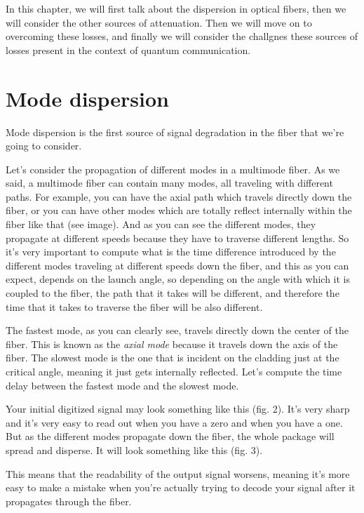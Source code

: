 In this chapter, we will first talk about the dispersion in optical fibers, then we will consider the other sources of attenuation. Then we will move on to overcoming these losses, and finally we will consider the challgnes these sources of losses present in the context of quantum communication.


\section{Mode dispersion}
\label{sec:11-2_mode_dispersion}

Mode dispersion is the first source of signal degradation in the fiber that we're going to consider.

Let's consider the propagation of different modes in a multimode fiber. As we said, a multimode fiber can contain many modes, all traveling with different paths. For example, you can have the axial path which travels directly down the fiber, or you can have other modes which are  totally reflect internally within the fiber like that (see image). And as you can see the different modes, they propagate at different speeds because they have to traverse different lengths. So it's very important to compute what is the time difference introduced by the different modes traveling at different speeds down the fiber, and this as you can expect, depends on the launch angle, so depending on the angle with which it is coupled to the fiber, the path that it takes will be different, and therefore the time that it takes to traverse the fiber will be also different.

The fastest mode, as you can clearly see, travels directly down the center of the fiber. This is known as the \emph{axial mode} because it travels down the axis of the fiber. The slowest mode is the one that is incident on the cladding just at the critical angle, meaning it just gets internally reflected.  Let's compute the time delay between the fastest mode and the slowest mode.

Your initial digitized signal may look something like this (fig. 2). It's very sharp and it's very easy to read out when you have a zero and when you have a one. But as the different modes propagate down the fiber, the whole package will spread and disperse. It will look something like this (fig. 3).

This means that the readability of the output signal worsens, meaning it's more easy to make a mistake when you're actually trying to decode your signal after it propagates through the fiber.

